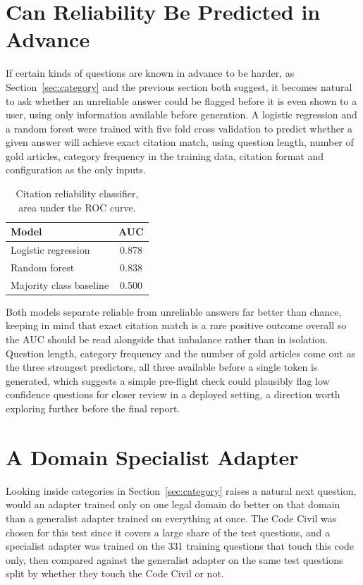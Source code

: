 \documentclass[11pt, a4paper]{article}
\begin{document}
\section{Can Reliability Be Predicted in Advance}

If certain kinds of questions are known in advance to be harder, as Section~\ref{sec:category} and the previous section both suggest, it becomes natural to ask whether an unreliable answer could be flagged before it is even shown to a user, using only information available before generation. A logistic regression and a random forest were trained with five fold cross validation to predict whether a given answer will achieve exact citation match, using question length, number of gold articles, category frequency in the training data, citation format and configuration as the only inputs.

\begin{table}[H]
\centering
\small
\begin{tabular}{lc}
\toprule
\textbf{Model} & \textbf{AUC} \\
\midrule
Logistic regression & 0.878 \\
Random forest & 0.838 \\
Majority class baseline & 0.500 \\
\bottomrule
\end{tabular}
\caption{Citation reliability classifier, area under the ROC curve.}
\label{tab:mlpred}
\end{table}

Both models separate reliable from unreliable answers far better than chance, keeping in mind that exact citation match is a rare positive outcome overall so the AUC should be read alongside that imbalance rather than in isolation. Question length, category frequency and the number of gold articles come out as the three strongest predictors, all three available before a single token is generated, which suggests a simple pre-flight check could plausibly flag low confidence questions for closer review in a deployed setting, a direction worth exploring further before the final report.

\section{A Domain Specialist Adapter}
\label{sec:specialist}

Looking inside categories in Section~\ref{sec:category} raises a natural next question, would an adapter trained only on one legal domain do better on that domain than a generalist adapter trained on everything at once. The Code Civil was chosen for this test since it covers a large share of the test questions, and a specialist adapter was trained on the 331 training questions that touch this code only, then compared against the generalist adapter on the same test questions split by whether they touch the Code Civil or not.
\end{document}
